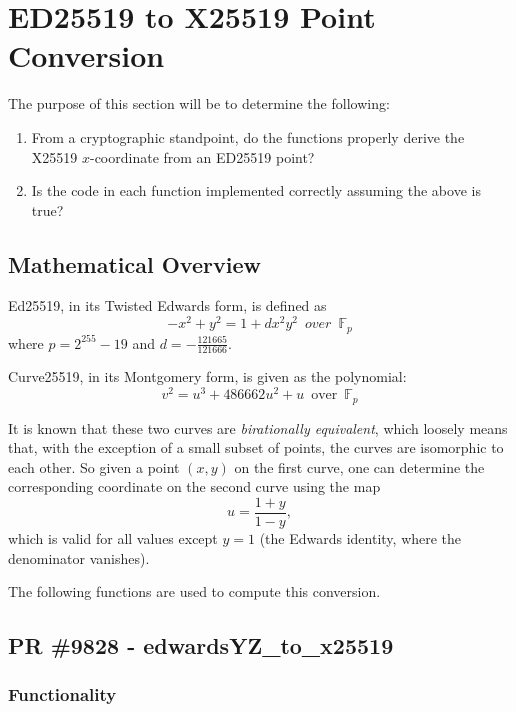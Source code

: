 \documentclass[12pt,titlepage,table]{article}
\begin{document}
\newpage

\section{ED25519 to X25519 Point Conversion}
The purpose of this section will be to determine the following:
\begin{enumerate}
    \item From a cryptographic standpoint, do the functions properly derive the X25519 $x$-coordinate from an ED25519 point?
    \item Is the code in each function implemented correctly assuming the above is true?
\end{enumerate}

\subsection{Mathematical Overview}
Ed25519, in its Twisted Edwards form, is defined as
$$-x^2 + y^2 =  1 + dx^2y^2 \, \, \, over \, \, \, \mathbb{F}_p$$
where $p = 2^{255}-19$ and $d = -\frac{121665}{121666}$.

\medskip
Curve25519, in its Montgomery form, is given as the polynomial:
$$v^2 = u^3 + 486662u^2 + u \, \, \, \text{over} \, \, \, \mathbb{F}_p$$

\medskip
It is known that these two curves are \textit{birationally equivalent}, which loosely means that, with the exception of a small subset of points, the curves are isomorphic to each other. So given a point $(x,y)$ on the first curve, one can determine the corresponding coordinate on the second curve using the map
$$u = \frac{1+y}{1-y},$$
which is valid for all values except $y = 1$ (the Edwards identity, where the denominator vanishes).

\medskip
The following functions are used to compute this conversion.


\newpage
\subsection{PR \#9828 - edwardsYZ\_to\_x25519}
\subsubsection{Functionality}

\end{document}
